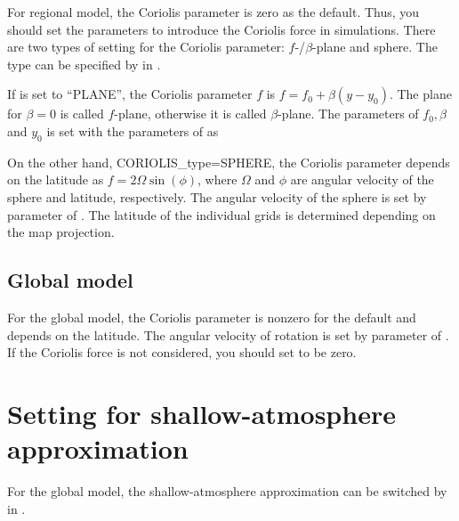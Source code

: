 For regional model, 
the Coriolis parameter is zero as the default. 
Thus, you should set the parameters to introduce the Coriolis force in simulations.
There are two types of setting for the Coriolis parameter: $f$-/$\beta$-plane and sphere.
The type can be specified by  in .

If  is set to ``PLANE'', the Coriolis parameter $f$ is $f=f_0 + \beta (y-y_0)$.
The plane for $\beta=0$ is called $f$-plane, otherwise it is called $\beta$-plane.
The parameters of $f_0, \beta$ and $y_0$ is set with the parameters of  as


On the other hand, CORIOLIS\_type=SPHERE, 
the Coriolis parameter depends on the latitude as $f = 2\Omega \sin(\phi)$, 
where $\Omega$ and $\phi$ are angular velocity of the sphere and latitude, respectively.
The angular velocity of the sphere is set by  parameter of .
The latitude of the individual grids is determined depending on the map projection.

\subsection{Global model}
For the global model, 
the Coriolis parameter is nonzero for the default and depends on the latitude. 
The angular velocity of rotation is set by  parameter of .
If the Coriolis force is not considered, you should set  to be zero. 


\section{Setting for shallow-atmosphere approximation}
\label{sec:shallow_atmosphere_approx}
For the global model, the shallow-atmosphere approximation can be switched by  in .

